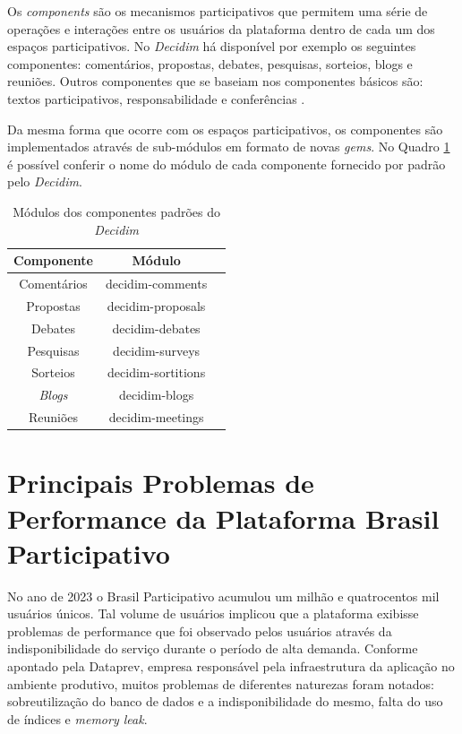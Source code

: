 Os \textit{components} são os mecanismos participativos que permitem uma série de operações e interações entre os usuários da plataforma dentro de cada um dos espaços participativos. No \textit{Decidim} há disponível por exemplo os seguintes componentes: comentários, propostas, debates, pesquisas, sorteios, blogs e reuniões. Outros componentes que se baseiam nos componentes básicos são: textos participativos, responsabilidade e conferências \cite{decidim-descriptionpage}.

Da mesma forma que ocorre com os espaços participativos, os componentes são implementados através de sub-módulos em formato de novas \textit{gems}. No Quadro \ref{tab:modulos-components} é possível conferir o nome do módulo de cada componente fornecido por padrão pelo \textit{Decidim}.

\begin{table}
  \centering
  \caption{Módulos dos componentes padrões do \textit{Decidim}}
  \label{tab:modulos-components}
  \begin{tabular}{|c|c|c|}
    \hline
    Componente & Módulo \\
    \hline
    Comentários & decidim-comments \\
    Propostas & decidim-proposals \\
    Debates & decidim-debates \\
    Pesquisas & decidim-surveys \\
    Sorteios & decidim-sortitions \\
    \textit{Blogs} & decidim-blogs \\
    Reuniões & decidim-meetings \\
    \hline
  \end{tabular}
\end{table}

\section{Principais Problemas de Performance da Plataforma Brasil Participativo}
\label{sec:principais_problemas_de_performance_da_plataforma_brasil_participativo}

No ano de 2023 o Brasil Participativo acumulou um milhão e quatrocentos mil usuários únicos. Tal volume de usuários implicou que a plataforma exibisse problemas de performance que foi observado pelos usuários através da indisponibilidade do serviço durante o período de alta demanda. Conforme apontado pela Dataprev, empresa responsável pela infraestrutura da aplicação no ambiente produtivo, muitos problemas de diferentes naturezas foram notados: sobreutilização do banco de dados e a indisponibilidade do mesmo, falta do uso de índices e \textit{memory leak}.

